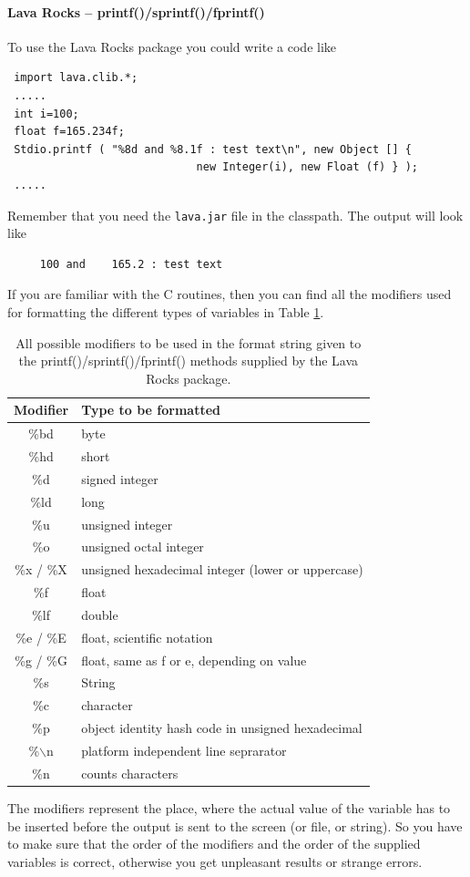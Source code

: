 \paragraph{Lava Rocks -- printf()/sprintf()/fprintf()}
To use the Lava Rocks package you could write a code like
\begin{small}
\begin{verbatim}
 import lava.clib.*;
 .....
 int i=100;
 float f=165.234f;
 Stdio.printf ( "%8d and %8.1f : test text\n", new Object [] { 
                             new Integer(i), new Float (f) } );
 .....                 
\end{verbatim}
\end{small}
Remember that you need the \verb|lava.jar| file in the classpath.
The output will look like
\begin{verbatim}
     100 and    165.2 : test text
\end{verbatim}
If you are familiar with the C routines, then you can find all
the modifiers used for formatting the different types of variables
in Table \ref{tab:PrintfModifiers}.
\begin{table}[htbp]
  \begin{center}
    \begin{tabular}{cl}
      Modifier & Type to be formatted \\ \hline
      \%bd & byte \\
      \%hd & short \\
      \%d & signed integer \\
      \%ld & long \\
      \%u & unsigned integer \\
      \%o & unsigned octal integer \\
      \%x / \%X & unsigned hexadecimal integer (lower or uppercase)\\
      \%f & float \\
      \%lf & double \\
      \%e / \%E & float, scientific notation \\
      \%g / \%G & float, same as f or e, depending on value \\
      \%s & String \\
      \%c & character\\
      \%p & object identity hash code in unsigned hexadecimal \\
      \%$\backslash$n & platform independent line seprarator\\
      \%n & counts characters\\
    \end{tabular}
    \caption{All possible modifiers to be used in the format 
      string given to the printf()/sprintf()/fprintf() methods supplied 
      by the Lava Rocks package.}
    \label{tab:PrintfModifiers}
  \end{center}
\end{table}
The modifiers represent the place, where the actual value of the variable 
has to be inserted before the output is sent to the screen (or file, 
or string). So you have to make sure that the order of the modifiers and
the order of the supplied variables is correct, otherwise you get
unpleasant results or strange errors.

